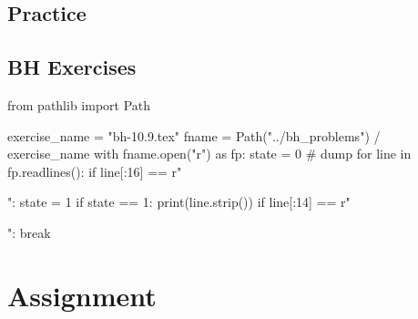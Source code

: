 \subsection{Practice}
\label{sec:practice}




\subsection{BH Exercises}
\label{sec:bh-exercises-1}


\begin{pycode}
from pathlib import Path

exercise_name = "bh-10.9.tex"
fname = Path("../bh_problems") / exercise_name
with fname.open("r") as fp:
    state = 0  # dump
    for line in fp.readlines():
        if line[:16] == r"\begin{exercise}":
            state = 1
        if state == 1:
            print(line.strip())
        if line[:14] == r"\end{exercise}":
            break
\end{pycode}







\section{Assignment}
\label{sec:assignment}





